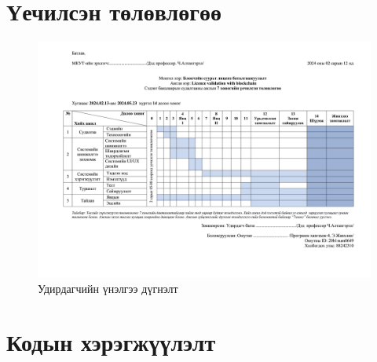 \appendix
{}

\chapter{Үечилсэн төлөвлөгөө}
\begin{figure}[h!]
   \centering
   \includegraphics[scale=0.065, angle=90]{src/images/periodic-plan.png}
   \caption{Удирдагчийн үнэлгээ дүгнэлт}
\end{figure}


\chapter{Кодын хэрэгжүүлэлт}

